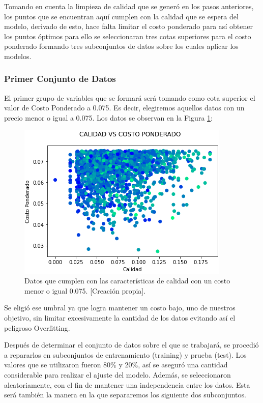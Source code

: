 \documentclass{article}
\begin{document}
Tomando en cuenta la limpieza de calidad que se generó en los pasos anteriores, los puntos que se encuentran aquí cumplen con la calidad que se espera del modelo, derivado de esto, hace falta limitar el costo ponderado para así obtener los puntos óptimos para ello se seleccionaran tres cotas superiores para el costo ponderado formando tres subconjuntos de datos sobre los cuales aplicar los modelos.

\subsubsection{Primer Conjunto de Datos}

El primer grupo de variables que se formará será tomando como cota superior el valor de Costo Ponderado  a 0.075. Es decir, elegiremos aquellos datos con un precio menor o igual a 0.075. Los datos se observan en la Figura \ref{fig:costo_calidad_acotada1}:
\pagebreak
\begin{figure}[!h]
    \centering
    \includegraphics[scale=.7]{F4/F4-im2.PNG}
    \caption{Datos que cumplen con las características de calidad con un costo menor o igual 0.075. [Creación propia].}
    \label{fig:costo_calidad_acotada1}
\end{figure}

Se eligió ese umbral ya que logra mantener un costo bajo, uno de nuestros objetivo, sin limitar excesivamente la cantidad de los datos evitando así el peligroso Overfitting.

Después de determinar el conjunto de datos sobre el que se trabajará, se procedió a repararlos en subconjuntos de entrenamiento (training) y prueba (test). Los valores que se utilizaron fueron 80\% y 20\%, así se aseguró una cantidad considerable para realizar el ajuste del modelo. Además, se seleccionaron aleatoriamente, con el fin de mantener una independencia entre los datos. Esta será también la manera en la que separaremos los siguiente dos subconjuntos.
\end{document}
